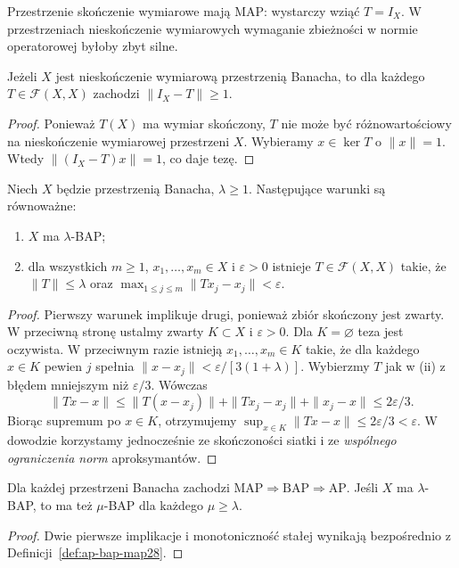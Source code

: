 Przestrzenie skończenie wymiarowe mają MAP: wystarczy wziąć
$T=I_X$. W przestrzeniach nieskończenie wymiarowych wymaganie
zbieżności w normie operatorowej byłoby zbyt silne.

\begin{stwierdzenie}
\label{prop:no-norm-identity28}
Jeżeli $X$ jest nieskończenie wymiarową przestrzenią Banacha,
to dla każdego $T\in\mathcal F(X,X)$ zachodzi
$\|I_X-T\|\ge1$.
\end{stwierdzenie}
\begin{proof}
Ponieważ $T(X)$ ma wymiar skończony, $T$ nie może być
różnowartościowy na nieskończenie wymiarowej przestrzeni $X$.
Wybieramy $x\in\ker T$ o $\|x\|=1$. Wtedy
$\|(I_X-T)x\|=1$, co daje tezę.
\end{proof}

\begin{lemat}
\label{lem:finite-bap28}
Niech $X$ będzie przestrzenią Banacha, $\lambda\ge1$.
Następujące warunki są równoważne:
\begin{enumerate}[label=\textup{(\roman*)}]
\item $X$ ma $\lambda$-BAP;
\item dla wszystkich $m\ge1$, $x_1,\ldots,x_m\in X$ i
$\varepsilon>0$ istnieje $T\in\mathcal F(X,X)$ takie,
że $\|T\|\le\lambda$ oraz
$\max_{1\le j\le m}\|Tx_j-x_j\|<\varepsilon$.
\end{enumerate}
\end{lemat}
\begin{proof}
Pierwszy warunek implikuje drugi, ponieważ zbiór skończony
jest zwarty. W przeciwną stronę ustalmy zwarty $K\subset X$
i $\varepsilon>0$. Dla $K=\varnothing$ teza jest oczywista.
W przeciwnym razie istnieją $x_1,\ldots,x_m\in K$
takie, że dla każdego $x\in K$ pewien $j$ spełnia
$\|x-x_j\|<\varepsilon/[3(1+\lambda)]$.
Wybierzmy $T$ jak w (ii) z błędem mniejszym niż
$\varepsilon/3$. Wówczas
\[
\|Tx-x\|\le\|T(x-x_j)\|+\|Tx_j-x_j\|+\|x_j-x\|
\le 2\varepsilon/3.
\]
Biorąc supremum po $x\in K$, otrzymujemy
$\sup_{x\in K}\|Tx-x\|\le2\varepsilon/3<\varepsilon$.
W dowodzie korzystamy jednocześnie ze skończoności siatki
i ze \emph{wspólnego ograniczenia norm} aproksymantów.
\end{proof}

\begin{wniosek}
\label{cor:hierarchy28}
Dla każdej przestrzeni Banacha zachodzi
$\mathrm{MAP}\Rightarrow\mathrm{BAP}\Rightarrow\mathrm{AP}$.
Jeśli $X$ ma $\lambda$-BAP, to ma też $\mu$-BAP
dla każdego $\mu\ge\lambda$.
\end{wniosek}
\begin{proof}
Dwie pierwsze implikacje i monotoniczność stałej wynikają
bezpośrednio z Definicji~\ref{def:ap-bap-map28}.
\end{proof}


